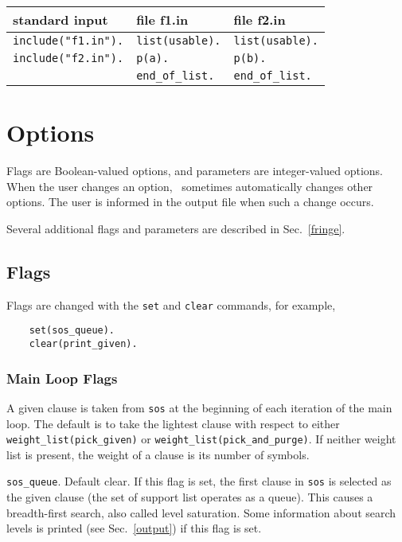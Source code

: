 \documentclass[11pt]{article}
\begin{document}
\begin{center}
\begin{tabular}{l|l|l}
standard input           & file f1.in           & file f2.in           \\
\hline
\verb:include("f1.in").: & \verb:list(usable).: & \verb:list(usable).: \\
\verb:include("f2.in").: & \verb:p(a).:         & \verb:p(b).:         \\
                         & \verb:end_of_list.:  & \verb:end_of_list.:
\end{tabular}
\end{center}

\section{Options} \label{options}

Flags are Boolean-valued options, and parameters are integer-valued
options.  When the user changes an option, \otter\ sometimes
automatically changes other options.  The user is informed in the
output file when such a change occurs.

Several additional flags and parameters are described in Sec.~\ref{fringe}.

\subsection{Flags}

Flags are changed with the \verb:set: and \verb:clear: commands, for
example,

{\small
\begin{verbatim}
    set(sos_queue).
    clear(print_given).
\end{verbatim}
}

\subsubsection{Main Loop Flags} \label{loop-flags}

A given clause is taken from \verb:sos: at the beginning of each
iteration of the main loop.  The default is to take the lightest
clause with respect to either \verb:weight_list(pick_given): or
\verb:weight_list(pick_and_purge):.  If neither weight list is present,
the weight of a clause is its number of symbols.

\noindent
\verb:sos_queue:.  Default clear.  If this flag is set,
the first clause in \verb:sos: is selected as the given clause (the set of
support list operates as a queue).  This causes a breadth-first
search, also called level saturation.  Some information about search
levels is printed (see Sec.~\ref{output}) if this flag is set.
\end{document}
